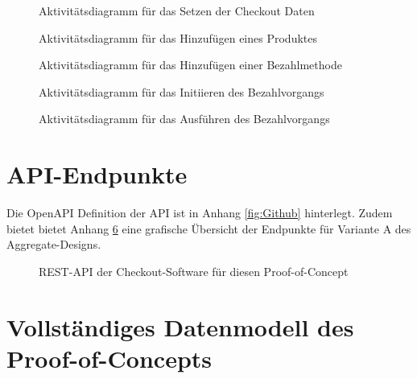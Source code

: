 \begin{anhang}
\begin{figure}[h!]
	\centering
	
	\caption{Aktivitätsdiagramm für das Setzen der Checkout Daten}
	\label{fig:SL-Checkoutdata}
\end{figure}

\begin{figure}[h!]
	\centering
	
	\caption{Aktivitätsdiagramm für das Hinzufügen eines Produktes }
	\label{fig:SL-AddProduct}
\end{figure}

\begin{figure}[h!]
	\centering
	
	\caption{Aktivitätsdiagramm für das Hinzufügen einer Bezahlmethode}
	\label{fig:SL-PutBezahlmethode}
\end{figure}

\begin{figure}[h!]
	\centering
	
	\caption{Aktivitätsdiagramm für das Initiieren des Bezahlvorgangs }
	\label{fig:SL-InitPayment}
\end{figure}

\begin{figure}[h!]
	\centering
	
	\caption{Aktivitätsdiagramm für das Ausführen des Bezahlvorgangs }
	\label{fig:SL-ExecPayment}
\end{figure}

\section{API-Endpunkte}

Die OpenAPI Definition der API ist in Anhang \ref{fig:Github} hinterlegt. Zudem bietet bietet Anhang \ref{fig:REST-API} eine grafische Übersicht der Endpunkte für Variante A des Aggregate-Designs.

\begin{figure}[h!]
	\centering
	
	\caption{REST-API der Checkout-Software für diesen Proof-of-Concept}
	\label{fig:REST-API}
\end{figure}

\section{Vollständiges Datenmodell des Proof-of-Concepts} \label{label:Daten-Modell}


\end{anhang}
